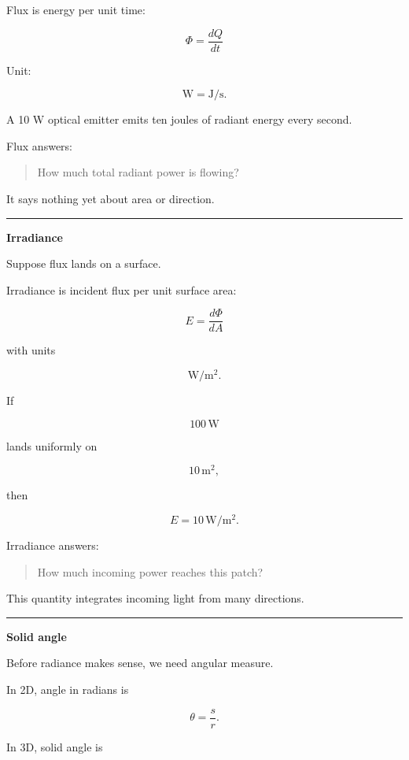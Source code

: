 \hypertarget{03-visual-computing-i-ch004-radiant-flux}{}

Flux is energy per unit time:

\[
\boxed{
\Phi=\frac{dQ}{dt}
}
\]

Unit:

\[
\mathrm W = \mathrm{J/s}.
\]

A 10 W optical emitter emits ten joules of radiant energy every second.

Flux answers:

\begin{quote}
How much total radiant power is flowing?
\end{quote}

It says nothing yet about area or direction.

\begin{center}\rule{0.5\linewidth}{0.5pt}\end{center}

\textbf{Irradiance}

Suppose flux lands on a surface.

Irradiance is incident flux per unit surface area:

\[
\boxed{
E=\frac{d\Phi}{dA}
}
\]

with units

\[
\mathrm{W/m^2}.
\]

If

\[
100\,\mathrm W
\]

lands uniformly on

\[
10\,\mathrm{m^2},
\]

then

\[
E=10\,\mathrm{W/m^2}.
\]

Irradiance answers:

\begin{quote}
How much incoming power reaches this patch?
\end{quote}

This quantity integrates incoming light from many directions.

\begin{center}\rule{0.5\linewidth}{0.5pt}\end{center}

\textbf{Solid angle}

Before radiance makes sense, we need angular measure.

In 2D, angle in radians is

\[
\theta=\frac{s}{r}.
\]

In 3D, solid angle is

